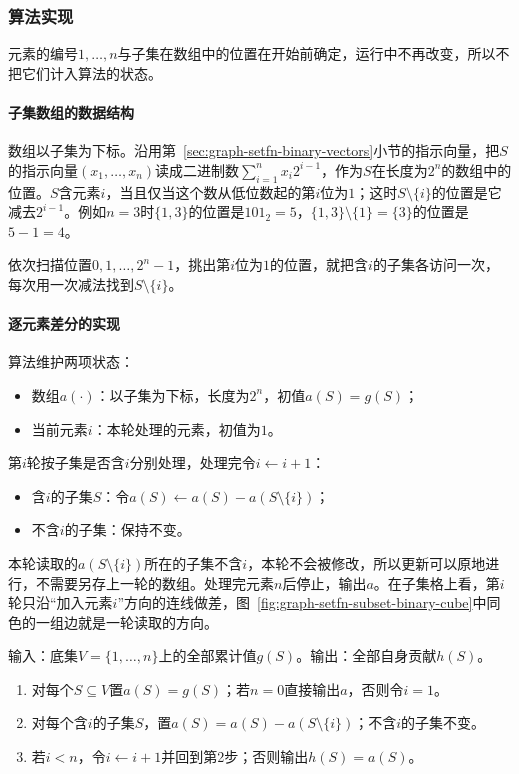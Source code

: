 \subsubsection{算法实现}

元素的编号$1,\ldots,n$与子集在数组中的位置在开始前确定，运行中不再改变，所以不把它们计入算法的状态。

\paragraph{子集数组的数据结构}
数组以子集为下标。沿用第~\ref{sec:graph-setfn-binary-vectors}小节的指示向量，把$S$的指示向量$(x_1,\ldots,x_n)$读成二进制数$\sum_{i=1}^{n}x_i2^{i-1}$，作为$S$在长度为$2^n$的数组中的位置。$S$含元素$i$，当且仅当这个数从低位数起的第$i$位为$1$；这时$S\setminus\{i\}$的位置是它减去$2^{i-1}$。例如$n=3$时$\{1,3\}$的位置是$101_2=5$，$\{1,3\}\setminus\{1\}=\{3\}$的位置是$5-1=4$。

依次扫描位置$0,1,\ldots,2^n-1$，挑出第$i$位为$1$的位置，就把含$i$的子集各访问一次，每次用一次减法找到$S\setminus\{i\}$。

\paragraph{逐元素差分的实现}
算法维护两项状态：
\begin{itemize}
  \item 数组$a(\cdot)$：以子集为下标，长度为$2^n$，初值$a(S)=g(S)$；
  \item 当前元素$i$：本轮处理的元素，初值为$1$。
\end{itemize}
第$i$轮按子集是否含$i$分别处理，处理完令$i\gets i+1$：
\begin{itemize}
  \item 含$i$的子集$S$：令$a(S)\gets a(S)-a(S\setminus\{i\})$；
  \item 不含$i$的子集：保持不变。
\end{itemize}
本轮读取的$a(S\setminus\{i\})$所在的子集不含$i$，本轮不会被修改，所以更新可以原地进行，不需要另存上一轮的数组。处理完元素$n$后停止，输出$a$。在子集格上看，第$i$轮只沿“加入元素$i$”方向的连线做差，图~\ref{fig:graph-setfn-subset-binary-cube}中同色的一组边就是一轮读取的方向。

\begin{algorithm}[逐元素差分]
\label{alg:graph-setfn-mobius-coordinate}
输入：底集$V=\{1,\ldots,n\}$上的全部累计值$g(S)$。输出：全部自身贡献$h(S)$。
\begin{enumerate}
  \item 对每个$S\subseteq V$置$a(S)=g(S)$；若$n=0$直接输出$a$，否则令$i=1$。
  \item 对每个含$i$的子集$S$，置$a(S)=a(S)-a(S\setminus\{i\})$；不含$i$的子集不变。
  \item 若$i<n$，令$i\gets i+1$并回到第2步；否则输出$h(S)=a(S)$。
\end{enumerate}
\end{algorithm}

